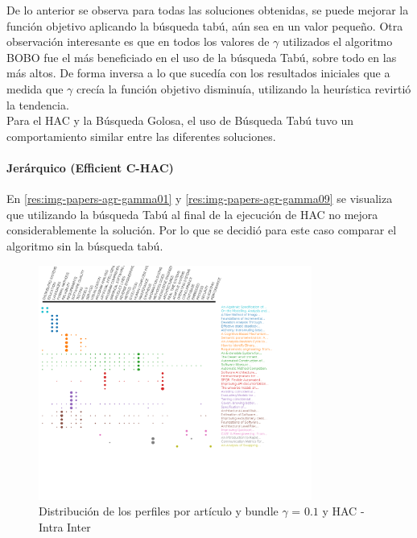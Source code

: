 De lo anterior se observa para todas las soluciones obtenidas, se puede mejorar la función objetivo aplicando la búsqueda tabú, aún sea en un valor pequeño. Otra observación interesante es que en todos los valores de $\gamma$ utilizados el algoritmo BOBO fue el más beneficiado en el uso de la búsqueda Tabú, sobre todo en las más altos. De forma inversa a lo que sucedía con los resultados iniciales que a medida que $\gamma$ crecía la función objetivo disminuía, utilizando la heurística revirtió la tendencia.\\
Para el HAC y la Búsqueda Golosa, el uso de Búsqueda Tabú tuvo un comportamiento similar entre las diferentes soluciones.\\

\paragraph{Jerárquico (Efficient C-HAC)}
En \ref{res:img-papers-agr-gamma01} y \ref{res:img-papers-agr-gamma09} se visualiza que utilizando la búsqueda Tabú al final de la ejecución de HAC no mejora considerablemente la solución. Por lo que se decidió para este caso comparar el algoritmo sin la búsqueda tabú.
\begin{figure}[H]
  \centering
    \includegraphics[width=0.8\textwidth]{resultados/papers/HAC/INTRA_INTER/gamma-01.png}
  \caption{Distribución de los perfiles por artículo y bundle $\gamma$ = $0.1$ y HAC - Intra Inter}
  \label{res:img-papers-gamma01-hac-intra-inter}
\end{figure}

